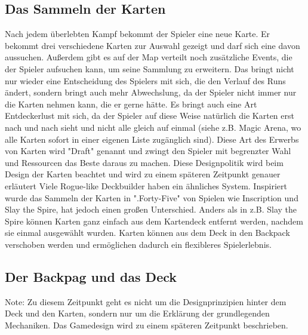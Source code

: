 \subsection{Das Sammeln der Karten}\label{sammeln_der_Karten}

Nach jedem überlebten Kampf bekommt der Spieler eine neue Karte. Er bekommt drei verschiedene Karten zur Auswahl gezeigt und darf sich eine davon aussuchen.
Außerdem gibt es auf der Map verteilt noch zusätzliche Events, die der Spieler aufsuchen kann, um seine Sammlung zu erweitern.
Das bringt nicht nur wieder eine Entscheidung des Spielers mit sich, die den Verlauf des Runs ändert, sondern bringt auch mehr Abwechslung,
da der Spieler nicht immer nur die Karten nehmen kann, die er gerne hätte. Es bringt auch eine Art Entdeckerlust mit sich, da der Spieler
auf diese Weise natürlich die Karten erst nach und nach sieht und nicht alle gleich auf einmal (siehe z.B. Magic Arena, wo alle Karten sofort in einer eigenen Liste zugänglich sind). %
Diese Art des Erwerbs von Karten wird "Draft" genannt %
und zwingt den Spieler mit begrenzter Wahl und Ressourcen das Beste daraus zu machen. Diese Designpolitik wird beim Design der Karten beachtet und wird zu einem späteren Zeitpunkt genauer erläutert %
Viele Rogue-like Deckbuilder haben ein ähnliches System. Inspiriert wurde das Sammeln der Karten in ".Forty-Five" von Spielen wie Inscription und Slay the Spire, %
hat jedoch einen großen Unterschied. Anders als in z.B. Slay the Spire können Karten ganz einfach aus dem Kartendeck entfernt werden, nachdem sie einmal ausgewählt wurden.
Karten können aus dem Deck in den Backpack verschoben werden und ermöglichen dadurch ein flexibleres Spielerlebnis. %


\subsection{Der Backpag und das Deck}\label{backpack_and_deck}
\begin{infoBox}
\end{infoBox}
Note: Zu diesem Zeitpunkt geht es nicht um die Designprinzipien hinter dem Deck und den Karten,
sondern nur um die Erklärung der grundlegenden Mechaniken. Das Gamedesign wird zu einem späteren Zeitpunkt beschrieben.

